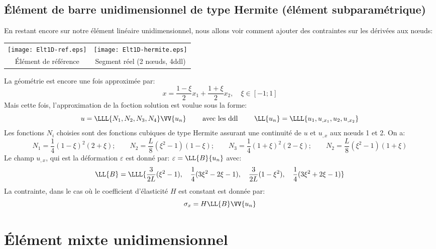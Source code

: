    \subsection{Élément de barre unidimensionnel de type Hermite (élément subparamétrique)}
\fi
En restant encore sur notre élément linéaire unidimensionnel, nous allons voir comment ajouter des
contraintes sur les dérivées aux nœuds:
\begin{table}[ht]\centering
\begin{tabular}{cc}
\texttt{[image: Elt1D-ref.eps]} &
\texttt{[image: Elt1D-hermite.eps]} \\
Élément de référence & Segment réel (2 nœuds, 4ddl)
\end{tabular}
\end{table}
\medskipvm
La géométrie est encore une fois approximée par:
\begin{equation} x=\frac{1-\xi}2 x_1 + \frac{1+\xi}2 x_2, \quad \xi\in[-1;1] \end{equation}
\medskipvm
Mais cette fois, l'approximation de la foction solution est voulue sous la forme:
\begin{equation}
u = \LLL{N_1, N_2, N_3, N_4}\VV{u_n} \qquad \text{ avec les ddl } \qquad
\LL{u_n}=\LLL{u_1, u_{,x_1}, u_2, u_{,x_2}} 
\end{equation}
\medskipvm
Les fonctions $N_i$ choisies sont des fonctions cubiques de type Hermite assurant une continuité
de $u$ et $u_{,x}$ aux nœuds 1 et 2. On a:
\begin{equation}
N_1=\frac14(1-\xi)^2(2+\xi); \qquad
N_2=\frac{L}8(\xi^2-1)(1-\xi); \qquad
N_3=\frac14(1+\xi)^2(2-\xi); \qquad
N_2=\frac{L}8(\xi^2-1)(1+\xi)
\end{equation}
\medskipvm
Le champ $u_{,x}$, qui est la déformation $\varepsilon$ est donné par: $\varepsilon=\LL{B}\{u_n\}$ avec:
\begin{equation} \LL{B}=\LLL{\frac3{2L}(\xi^2-1), \quad \frac14(3\xi^2-2\xi-1), \quad \frac3{2L}(1-\xi^2), \quad
\frac14(3\xi^2+2\xi-1)}\end{equation}
\medskipvm
La contrainte, dans le cas où le coefficient d'élasticité $H$ est constant est
donnée par:
\begin{equation}\sigma_x=H \LL{B}\VV{u_n}\end{equation}
\medskipvm
\ifVersionAvecExemplesSepares
   \section{Élément mixte unidimensionnel}
\else
